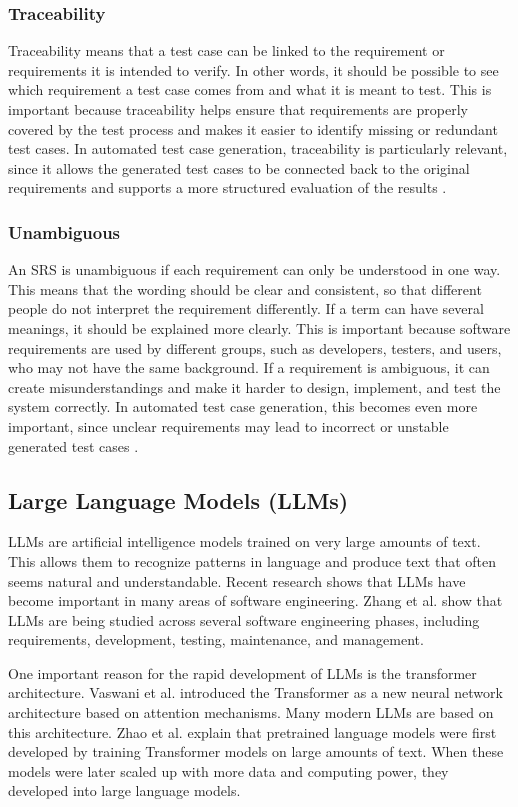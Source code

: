 \documentclass[a4paper,12pt]{article}
\begin{document}
\subsubsection{Traceability}
Traceability means that a test case can be linked to the requirement or requirements it is intended to verify. In other words, it should be possible to see which requirement a test case comes from and what it is meant to test. This is important because traceability helps ensure that requirements are properly covered by the test process and makes it easier to identify missing or redundant test cases. In automated test case generation, traceability is particularly relevant, since it allows the generated test cases to be connected back to the original requirements and supports a more structured evaluation of the results \cite{doe2011recommended}.

\subsubsection{Unambiguous}
An SRS is unambiguous if each requirement can only be understood in one way. This means that the wording should be clear and consistent, so that different people do not interpret the requirement differently. If a term can have several meanings, it should be explained more clearly. This is important because software requirements are used by different groups, such as developers, testers, and users, who may not have the same background. If a requirement is ambiguous, it can create misunderstandings and make it harder to design, implement, and test the system correctly. In automated test case generation, this becomes even more important, since unclear requirements may lead to incorrect or unstable generated test cases \cite{doe2011recommended}.


\subsection{Large Language Models (LLMs)}
LLMs are artificial intelligence models trained on very large amounts of text. This allows them to recognize patterns in language and produce text that often seems natural and understandable. Recent research shows that LLMs have become important in many areas of software engineering. Zhang et al. \cite{zhang2026survey} show that LLMs are being studied across several software engineering phases, including requirements, development, testing, maintenance, and management.

One important reason for the rapid development of LLMs is the transformer architecture. Vaswani et al. \cite{vaswani2017attention} introduced the Transformer as a new neural network architecture based on attention mechanisms. Many modern LLMs are based on this architecture. Zhao et al. \cite{zhao2023survey} explain that pretrained language models were first developed by training Transformer models on large amounts of text. When these models were later scaled up with more data and computing power, they developed into large language models.
\end{document}
